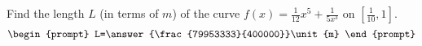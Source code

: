 \documentclass{ximera}
\author{Gregory Hartman \and Matthew Carr}
\begin{document}
\begin{exercise}





Find the length $L$ (in terms of $\unit{m}$) of the curve $f(x)=\frac{1}{12}x^5+\frac{1}{5x^3}$ on $[\frac{1}{10},1]$.
\[
\begin{prompt}
L=\answer{\frac{79953333}{400000}}\unit{m}
\end{prompt}
\]




\end{exercise}
\end{document}
